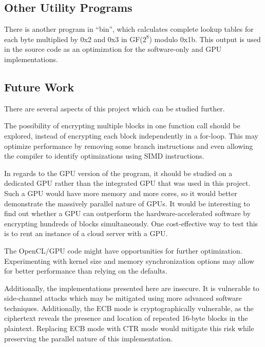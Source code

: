 \documentclass[a4paper,10pt,conference]{IEEEtran}
\begin{document}
\subsection{Other Utility Programs}

There is another program in ``bin'', which calculates complete lookup tables for each byte multiplied by 0x2 and 0x3 in GF($2^8$) modulo 0x1b.  This output is used in the source code as an optimization for the software-only and GPU implementations.

\subsection{Future Work}

There are several aspects of this project which can be studied further.

The possibility of encrypting multiple blocks in one function call should be explored, instead of encrypting each block independently in a for-loop. This may optimize performance by removing some branch instructions and even allowing the compiler to identify optimizations using SIMD instructions.

In regards to the GPU version of the program, it should be studied on a dedicated GPU rather than the integrated GPU that was used in this project. Such a GPU would have more memory and more cores, so it would better demonstrate the massively parallel nature of GPUs. It would be interesting to find out whether a GPU can outperform the hardware-accelerated software by encrypting hundreds of blocks simultaneously. One cost-effective way to test this is to rent an instance of a cloud server with a GPU.

The OpenCL/GPU code might have opportunities for further optimization.  Experimenting with kernel size and memory synchronization options may allow for better performance than relying on the defaults.

Additionally, the implementations presented here are insecure. It is vulnerable to side-channel attacks which may be mitigated using more advanced software techniques. Additionally, the ECB mode is cryptographically vulnerable, as the ciphertext reveals the presence and location of repeated 16-byte blocks in the plaintext. Replacing ECB mode with CTR mode would mitigate this risk while preserving the parallel nature of this implementation.



\end{document}

